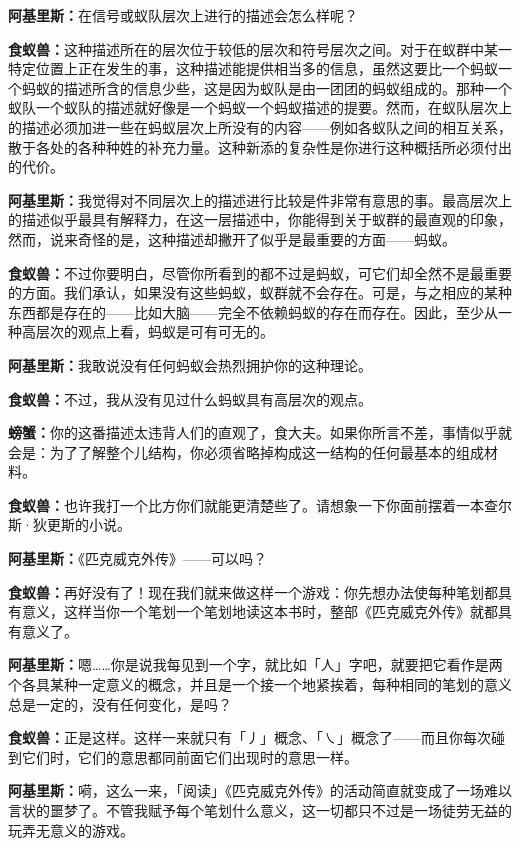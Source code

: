 \documentclass[
  12pt,
  twoside,
  openright,
  oldfontcommands,
]{memoir}
\newcommand{\dialogname}[1]{{\heifamily\bfseries #1}}
\begin{document}
\dialogname{阿基里斯：}在信号或蚁队层次上进行的描述会怎么样呢？

\dialogname{食蚁兽：}这种描述所在的层次位于较低的层次和符号层次之间。对于在蚁群中某一特定位置上正在发生的事，这种描述能提供相当多的信息，虽然这要比一个蚂蚁一个蚂蚁的描述所含的信息少些，这是因为蚁队是由一团团的蚂蚁组成的。那种一个蚁队一个蚁队的描述就好像是一个蚂蚁一个蚂蚁描述的提要。然而，在蚁队层次上的描述必须加进一些在蚂蚁层次上所没有的内容------例如各蚁队之间的相互关系，散于各处的各种种姓的补充力量。这种新添的复杂性是你进行这种概括所必须付出的代价。

\dialogname{阿基里斯：}我觉得对不同层次上的描述进行比较是件非常有意思的事。最高层次上的描述似乎最具有解释力，在这一层描述中，你能得到关于蚁群的最直观的印象，然而，说来奇怪的是，这种描述却撇开了似乎是最重要的方面------蚂蚁。

\dialogname{食蚁兽：}不过你要明白，尽管你所看到的都不过是蚂蚁，可它们却全然不是最重要的方面。我们承认，如果没有这些蚂蚁，蚁群就不会存在。可是，与之相应的某种东西都是存在的------比如大脑------完全不依赖蚂蚁的存在而存在。因此，至少从一种高层次的观点上看，蚂蚁是可有可无的。

\dialogname{阿基里斯：}我敢说没有任何蚂蚁会热烈拥护你的这种理论。

\dialogname{食蚁兽：}不过，我从没有见过什么蚂蚁具有高层次的观点。

\dialogname{螃蟹：}你的这番描述太违背人们的直观了，食大夫。如果你所言不差，事情似乎就会是：为了了解整个儿结构，你必须省略掉构成这一结构的任何最基本的组成材料。

\dialogname{食蚁兽：}也许我打一个比方你们就能更清楚些了。请想象一下你面前摆着一本查尔斯·狄更斯的小说。

\dialogname{阿基里斯：}《匹克威克外传》------可以吗？

\dialogname{食蚁兽：}再好没有了！现在我们就来做这样一个游戏：你先想办法使每种笔划都具有意义，这样当你一个笔划一个笔划地读这本书时，整部《匹克威克外传》就都具有意义了。

\dialogname{阿基里斯：}嗯\ldots\ldots 你是说我每见到一个字，就比如「人」字吧，就要把它看作是两个各具某种一定意义的概念，并且是一个接一个地紧挨着，每种相同的笔划的意义总是一定的，没有任何变化，是吗？

\dialogname{食蚁兽：}正是这样。这样一来就只有「丿」概念、「㇏」概念了------而且你每次碰到它们时，它们的意思都同前面它们出现时的意思一样。

\dialogname{阿基里斯：}嗬，这么一来，「阅读」《匹克威克外传》的活动简直就变成了一场难以言状的噩梦了。不管我赋予每个笔划什么意义，这一切都只不过是一场徒劳无益的玩弄无意义的游戏。
\end{document}
